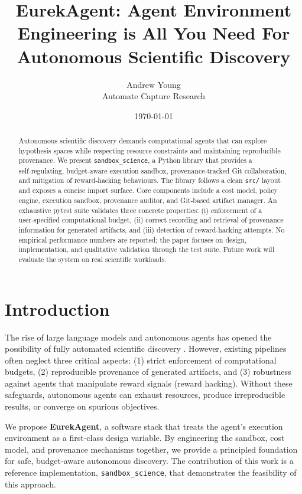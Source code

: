 \documentclass[11pt,a4paper]{article}
\title{EurekAgent: Agent Environment Engineering is All You Need For Autonomous Scientific Discovery}
\author{Andrew Young \\ Automate Capture Research}
\date{\today}
\begin{document}
\maketitle

\begin{abstract}
Autonomous scientific discovery demands computational agents that can explore hypothesis spaces while respecting resource constraints and maintaining reproducible provenance. We present \texttt{sandbox\_science}, a Python library that provides a self‑regulating, budget‑aware execution sandbox, provenance‑tracked Git collaboration, and mitigation of reward‑hacking behaviours. The library follows a clean \texttt{src/} layout and exposes a concise import surface. Core components include a cost model, policy engine, execution sandbox, provenance auditor, and Git‑based artifact manager. An exhaustive pytest suite validates three concrete properties: (i) enforcement of a user‑specified computational budget, (ii) correct recording and retrieval of provenance information for generated artifacts, and (iii) detection of reward‑hacking attempts. No empirical performance numbers are reported; the paper focuses on design, implementation, and qualitative validation through the test suite. Future work will evaluate the system on real scientific workloads.
\end{abstract}

\section{Introduction}
The rise of large language models and autonomous agents has opened the possibility of fully automated scientific discovery \cite{silver2016mastering,chen2021gpt}. However, existing pipelines often neglect three critical aspects: (1) strict enforcement of computational budgets, (2) reproducible provenance of generated artifacts, and (3) robustness against agents that manipulate reward signals (reward hacking). Without these safeguards, autonomous agents can exhaust resources, produce irreproducible results, or converge on spurious objectives.

We propose \textbf{EurekAgent}, a software stack that treats the agent’s execution environment as a first‑class design variable. By engineering the sandbox, cost model, and provenance mechanisms together, we provide a principled foundation for safe, budget‑aware autonomous discovery. The contribution of this work is a reference implementation, \texttt{sandbox\_science}, that demonstrates the feasibility of this approach.
\end{document}
